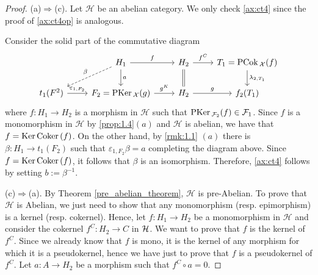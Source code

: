 \begin{proof}
(a)$\Rightarrow$(c). Let $\mathcal{H}$ be an abelian category. We only check \ref{ax:ct4}  since the proof of \ref{ax:ct4op} is analogous.

Consider the solid part of the commutative diagram
\begin{equation*}
\begin{tikzcd}
 & H_1\arrow{r}{f}\arrow{d}{a}\arrow[dashed]{dl}[']{\beta} & H_2\arrow{r}{f^C}\arrow[equal]{d} & T_1=\PCok_\mathcal{X}(f)\arrow{d}{\lambda_{2,T_1}}\\
t_1(F^2)\arrow{r}{\varepsilon_{1,F_2}} & F_2=\PKer_\mathcal{X}(g)\arrow{r}{g^K} & H_2\arrow{r}{g} &f_2(T_1)
\end{tikzcd}
\end{equation*}
where $f:H_1\to H_2$ is a morphism in $\mathcal{H}$ such that $\mathrm{\textup{PKer\,}}_{\mathcal{F}_2}(f)\in\mathcal{F}_1$. Since $f$ is a monomorphism in $\mathcal{H}$ by \ref{prop:1.4}$(a)$  and $\mathcal{H}$ is abelian, we have that $f=\mathrm{\textup{Ker\,}} \mathrm{\textup{Coker\,}} (f)$. On the other hand, by \ref{rmk:1.1} $(a)$ there is $\beta:H_1\to t_1(F_2)$ such that $\varepsilon_{1,F_2}\beta = a$ completing the diagram above. Since $f=\mathrm{\textup{Ker\,}} \mathrm{\textup{Coker\,}}(f)$, it follows that $\beta$ is an isomorphism. Therefore, \ref{ax:ct4} follows by setting $b:=\beta^{-1}$.





\smallskip\noindent
(c)$\Rightarrow$(a). By Theorem \ref{pre_abelian_theorem}, $\mathcal{H}$ is pre-Abelian. To prove that $\mathcal{H}$ is Abelian, we just need to show that any monomorphism (resp. epimorphism) is a kernel (resp. cokernel).
Hence, let $f\colon H_1\to H_2$ be a monomorphism in $\mathcal{H}$ and consider the cokernel $f^C\colon H_2\to C$ in $\mathcal H$. We want to prove that $f$ is the kernel of $f^C$. Since we already know that $f$ is mono, it is the kernel of any morphism for which it is a pseudokernel, hence we have just to prove that $f$ is a pseudokernel of $f^C$. Let $a\colon A\to H_2$ be a morphism such that $f^C\circ a=0$. 







\end{proof}
